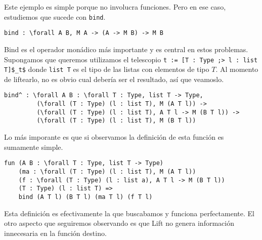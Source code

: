 Este ejemplo es simple porque no involucra funciones. Pero en ese caso, estudiemos que sucede con \lstinline{bind}.
\begin{lstlisting}
bind : \forall A B, M A -> (A -> M B) -> M B
\end{lstlisting}

Bind es el operador monádico más importante y es central en estos problemas.
Supongamos que queremos utilizamos el telescopio \lstinline{t := [T : Type ;> l : list T]$_t$} donde \lstinline{list T} es el tipo de las listas con elementos de tipo $T$.
Al momento de liftearlo, no es obvio cual debería ser el resultado, así que veamoslo.

\begin{lstlisting}
bind^ : \forall A B : \forall T : Type, list T -> Type,
         (\forall (T : Type) (l : list T), M (A T l)) ->
         (\forall (T : Type) (l : list T), A T l -> M (B T l)) ->
         (\forall (T : Type) (l : list T), M (B T l))
\end{lstlisting}

Lo más imporante es que si observamos la definición de esta función es sumamente simple.

\begin{lstlisting}
fun (A B : \forall T : Type, list T -> Type)
    (ma : \forall (T : Type) (l : list T), M (A T l))
    (f : \forall (T : Type) (l : list a), A T l -> M (B T l))
    (T : Type) (l : list T) =>
    bind (A T l) (B T l) (ma T l) (f T l)
\end{lstlisting}

Esta definición es efectivamente la que buscabamos y funciona perfectamente.
El otro aspecto que seguiremos observando es que Lift no genera información innecesaria en la función destino.